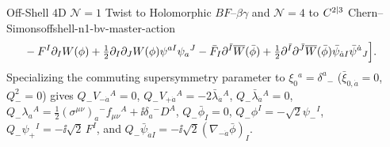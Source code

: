 \begin{zkmodule}{Off-Shell $4\mathrm{D}$ $\mathcal{N}=1$ Twist to Holomorphic $BF$--$\beta\gamma$ and $\mathcal{N}=4$ to $C^{2|3}$ Chern--Simons}{offshell-n1-bv-master-action}
\begin{equation}
\begin{aligned}
&- F^I\partial_I W(\phi) + \tfrac{1}{2}\partial_I\partial_J W(\phi)\psi^{a I}\psi_a{}^J - \bar{F}_I\partial^{\bar{I}}\overline{W}(\bar{\phi}) + \tfrac{1}{2}\partial^{\bar{I}}\partial^{\bar{J}}\overline{W}(\bar{\phi})\bar{\psi}_{\dot{a}I}\bar{\psi}^{\dot{a}}{}_J\Bigr].
\end{aligned}
\end{equation}
Specializing the commuting supersymmetry parameter to $\xi_0{}^a = \delta^a{}_-$ ($\bar{\xi}_{0,\dot{a}} = 0$, $Q_-^2 = 0$) gives $Q_- V_{-\dot{a}}{}^A = 0$, $Q_- V_{+\dot{a}}{}^A = -2\bar{\lambda}_{\dot{a}}{}^A$, $Q_-\bar{\lambda}_{\dot{a}}{}^A = 0$, $Q_-\lambda_a{}^A = \frac{1}{2}(\sigma^{\mu\nu})_a{}^- f_{\mu\nu}{}^A + \ii\delta_a{}^- D^A$, $Q_-\bar{\phi}_I = 0$, $Q_-\phi^I = -\sqrt{2}\psi_-{}^I$, $Q_-\psi_+{}^I = -\ii\sqrt{2}\,F^I$, and $Q_-\bar{\psi}_{\dot{a}I} = -\ii\sqrt{2}(\nabla_{-\dot{a}}\bar{\phi})_I$.
\end{zkmodule}

